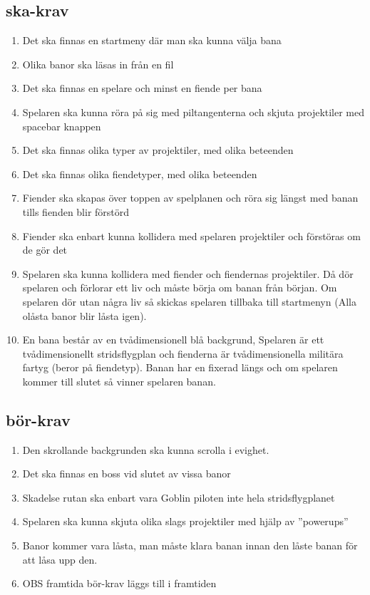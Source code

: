 \documentclass{TDP005mall}
\begin{document}
\subsection{ska-krav}
\begin{enumerate}
  \item Det ska finnas en startmeny där man ska kunna välja bana  
  \item Olika banor ska läsas in från en fil
  \item Det ska finnas en spelare och minst en fiende per bana
  \item Spelaren ska kunna röra på sig med piltangenterna och skjuta projektiler med spacebar knappen
  \item Det ska finnas olika typer av projektiler, med olika beteenden
  \item Det ska finnas olika fiendetyper, med olika beteenden 
  \item Fiender ska skapas över toppen av spelplanen och röra sig längst med banan tills fienden blir förstörd
  \item Fiender ska enbart kunna kollidera med spelaren projektiler och förstöras om de gör det
  \item Spelaren ska kunna kollidera med fiender och fiendernas projektiler. 
        Då dör spelaren och förlorar ett liv och måste börja om banan från början.
        Om spelaren dör utan några liv så skickas spelaren tillbaka till startmenyn (Alla olåsta banor blir låsta igen).
  \item En bana består av en tvådimensionell blå backgrund, Spelaren är ett tvådimensionellt stridsflygplan 
        och fienderna är tvådimensionella militära fartyg (beror på fiendetyp).
        Banan har en fixerad längs och om spelaren kommer till slutet så vinner spelaren banan.
\end{enumerate}
\subsection{bör-krav}
\begin{enumerate}
  \item Den skrollande backgrunden ska kunna scrolla i evighet.
  \item Det ska finnas en boss vid slutet av vissa banor
  \item Skadelse rutan ska enbart vara Goblin piloten inte hela stridsflygplanet
  \item Spelaren ska kunna skjuta olika slags projektiler med hjälp av ''powerups''
  \item Banor kommer vara låsta, man måste klara banan innan den låste banan för att låsa upp den.
  \item OBS framtida bör-krav läggs till i framtiden
\end{enumerate}
\end{document}

